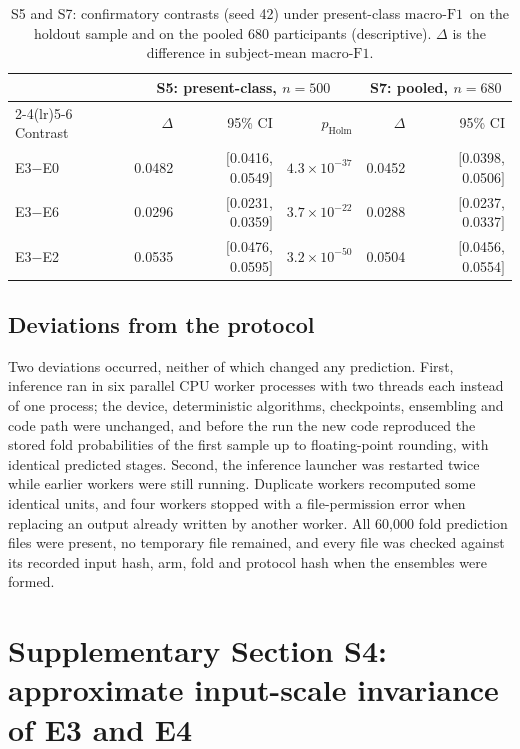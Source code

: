 \documentclass[10pt,a4paper]{article}
\newcommand{\mf}{\ensuremath{\mathrm{macro\text{-}F1}}}
\newcommand{\ci}{95\% CI}
\begin{document}
\begin{table}[H]
\centering\small
\caption{S5 and S7: confirmatory contrasts (seed 42) under present-class \mf\ on the holdout sample and
on the pooled 680 participants (descriptive). $\Delta$ is the difference in subject-mean \mf.}
\label{tab:sup_holdout_s5s7}
\begin{tabular}{lrrrrr}
\toprule
 & \multicolumn{3}{c}{S5: present-class, $n=500$} & \multicolumn{2}{c}{S7: pooled, $n=680$} \\
\cmidrule(lr){2-4}\cmidrule(lr){5-6}
Contrast & $\Delta$ & \ci & $p_{\mathrm{Holm}}$ & $\Delta$ & \ci \\
\midrule
E3$-$E0 & 0.0482 & $[$0.0416, 0.0549$]$ & $4.3\times10^{-37}$ & 0.0452 & $[$0.0398, 0.0506$]$ \\
E3$-$E6 & 0.0296 & $[$0.0231, 0.0359$]$ & $3.7\times10^{-22}$ & 0.0288 & $[$0.0237, 0.0337$]$ \\
E3$-$E2 & 0.0535 & $[$0.0476, 0.0595$]$ & $3.2\times10^{-50}$ & 0.0504 & $[$0.0456, 0.0554$]$ \\
\bottomrule
\end{tabular}
\end{table}

\subsection*{Deviations from the protocol}

Two deviations occurred, neither of which changed any prediction. First, inference ran in six parallel
CPU worker processes with two threads each instead of one process; the device, deterministic
algorithms, checkpoints, ensembling and code path were unchanged, and before the run the new code
reproduced the stored fold probabilities of the first sample up to floating-point rounding, with
identical predicted stages. Second, the inference launcher was restarted twice while earlier workers
were still running. Duplicate workers recomputed some identical units, and four workers stopped with
a file-permission error when replacing an output already written by another worker. All 60{,}000 fold
prediction files were present, no temporary file remained, and every file was checked against its
recorded input hash, arm, fold and protocol hash when the ensembles were formed.

\section*{Supplementary Section S4: approximate input-scale invariance of E3 and E4}
\label{sec:sup_e3e4}
\end{document}
